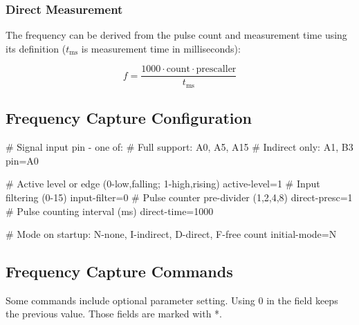 \subsubsection{Direct Measurement}

The frequency can be derived from the pulse count and measurement time using its definition ($t_\mathrm{ms}$ is measurement time in milliseconds):

\begin{equation}
f = \dfrac{1000\cdot\mathrm{count}\cdot\mathrm{prescaller}}
{t_\mathrm{ms}}
\end{equation}

\subsection{Frequency Capture Configuration}

\begin{inicode}
[FCAP:j@10]
# Signal input pin - one of:
#  Full support:  A0, A5, A15
#  Indirect only: A1, B3
pin=A0

# Active level or edge (0-low,falling; 1-high,rising)
active-level=1
# Input filtering (0-15)
input-filter=0
# Pulse counter pre-divider (1,2,4,8)
direct-presc=1
# Pulse counting interval (ms)
direct-time=1000

# Mode on startup: N-none, I-indirect, D-direct, F-free count
initial-mode=N
\end{inicode}

\subsection{Frequency Capture Commands}

Some commands include optional parameter setting. Using 0 in the field keeps the previous value. Those fields are marked with *.


